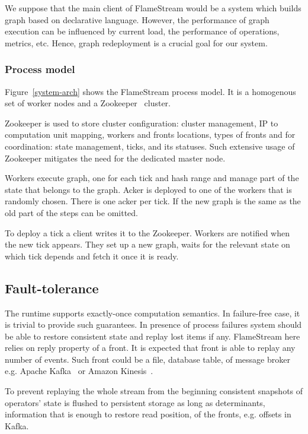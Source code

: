 We suppose that the main client of FlameStream would be a system which builds graph based on declarative language. However, the performance of graph execution can be influenced by current load, the performance of operations, metrics, etc. Hence, graph redeployment is a crucial goal for our system.

\subsubsection{Process model}
Figure~\ref{system-arch} shows the FlameStream process model. It is a homogenous set of worker nodes and a Zookeeper~\cite{hunt2010zookeeper} cluster. 

Zookeeper is used to store cluster configuration: cluster management, IP to computation unit mapping, workers and fronts locations, types of fronts and for coordination: state management, ticks, and its statuses. Such extensive usage of Zookeeper mitigates the need for the dedicated master node.

Workers execute graph, one for each tick and hash range and manage part of the state that belongs to the graph. Acker is deployed to one of the workers that is randomly chosen. There is one acker per tick. If the new graph is the same as the old part of the steps can be omitted.

To deploy a tick a client writes it to the Zookeeper. Workers are notified when the new tick appears. They set up a new graph, waits for the relevant state on which tick depends and fetch it once it is ready.

\subsection{Fault-tolerance}
The runtime supports exactly-once computation semantics. In failure-free case, it is trivial to provide such guarantees. In presence of process failures system should be able to restore consistent state and replay lost items if any. FlameStream here relies on reply property of a front. It is expected that front is able to replay any number of events. Such front could be a file, database table, of message broker e.g. Apache Kafka~\cite{kreps2011kafka} or Amazon Kinesis~\cite{amazon-kinesis}. 

To prevent replaying the whole stream from the beginning consistent snapshots of operators' state is flushed to persistent storage as long as determinants, information that is enough to restore read position, of the fronts, e.g. offsets in Kafka. 

